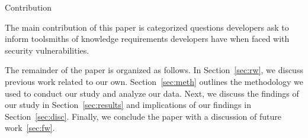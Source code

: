 \documentclass[conference]{IEEEtran}
\begin{document}
Contribution

The main contribution of this paper is categorized questions developers ask to inform toolsmiths of knowledge requirements developers have when faced with security vulnerabilities.

The remainder of the paper is organized as follows. In Section~\ref{sec:rw}, we discuss previous work related to our own. Section~\ref{sec:meth} outlines the methodology we used to conduct our study and analyze our data. Next, we discuss the findings of our study in Section~\ref{sec:results} and implications of our findings in Section~\ref{sec:disc}. Finally, we conclude the paper with a discussion of future work~\ref{sec:fw}.



%
%



%
%
\end{document}

